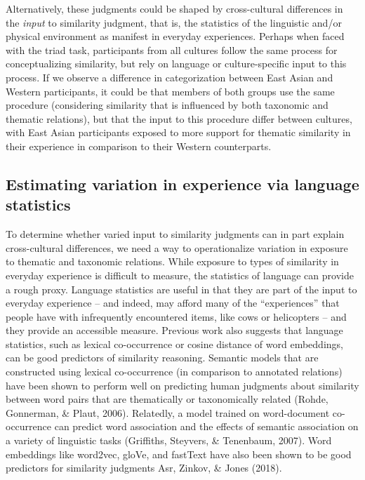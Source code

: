 \documentclass[10pt, letterpaper]{article}
\begin{document}
Alternatively, these judgments could be shaped by cross-cultural
differences in the \emph{input} to similarity judgment, that is, the
statistics of the linguistic and/or physical environment as manifest in
everyday experiences. Perhaps when faced with the triad task,
participants from all cultures follow the same process for
conceptualizing similarity, but rely on language or culture-specific
input to this process. If we observe a difference in categorization
between East Asian and Western participants, it could be that members of
both groups use the same procedure (considering similarity that is
influenced by both taxonomic and thematic relations), but that the input
to this procedure differ between cultures, with East Asian participants
exposed to more support for thematic similarity in their experience in
comparison to their Western counterparts.

\hypertarget{estimating-variation-in-experience-via-language-statistics}{%
\subsection{Estimating variation in experience via language
statistics}\label{estimating-variation-in-experience-via-language-statistics}}

To determine whether varied input to similarity judgments can in part
explain cross-cultural differences, we need a way to operationalize
variation in exposure to thematic and taxonomic relations. While
exposure to types of similarity in everyday experience is difficult to
measure, the statistics of language can provide a rough proxy. Language
statistics are useful in that they are part of the input to everyday
experience -- and indeed, may afford many of the ``experiences'' that
people have with infrequently encountered items, like cows or
helicopters -- and they provide an accessible measure. Previous work
also suggests that language statistics, such as lexical co-occurrence or
cosine distance of word embeddings, can be good predictors of similarity
reasoning. Semantic models that are constructed using lexical
co-occurrence (in comparison to annotated relations) have been shown to
perform well on predicting human judgments about similarity between word
pairs that are thematically or taxonomically related (Rohde, Gonnerman,
\& Plaut, 2006). Relatedly, a model trained on word-document
co-occurrence can predict word association and the effects of semantic
association on a variety of linguistic tasks (Griffiths, Steyvers, \&
Tenenbaum, 2007). Word embeddings like word2vec, gloVe, and fastText
have also been shown to be good predictors for similarity judgments Asr,
Zinkov, \& Jones (2018).
\end{document}
